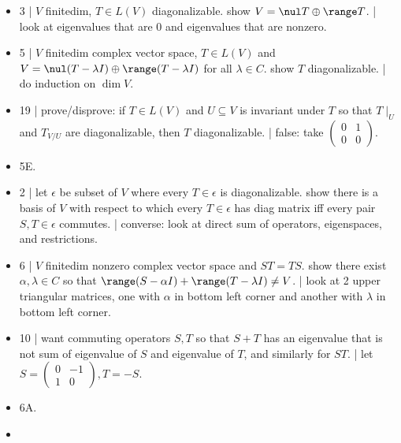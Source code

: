 \begin{itemize}
	\item 3 | $V$ finitedim, $T \in L(V)$ diagonalizable. show $V = \nul T \oplus \range T$. | look at eigenvalues that are 0 and eigenvalues that are nonzero. 
	\item 5 | $V$ finitedim complex vector space, $T \in L(V)$ and $V = \nul (T - \lambda I) \oplus \range (T - \lambda I)$ for all $\lambda \in C$. show $T$ diagonalizable. | do induction on $\dim V$. 
	\item 19 | prove/disprove: if $T \in L(V)$ and $U \subseteq V$ is invariant under $T$ so that $T \mid_U$ and $T_{V/U}$ are diagonalizable, then $T$ diagonalizable. | false: take $\begin{pmatrix} 0 & 1 \\ 0 & 0 \end{pmatrix}$. 
	\item 5E. 
	\item 2 | let $\epsilon$ be subset of $V$ where every $T \in \epsilon$ is diagonalizable. show there is a basis of $V$ with respect to which every $T \in \epsilon$ has diag matrix iff every pair $S,T \in \epsilon$ commutes. | converse: look at direct sum of operators, eigenspaces, and restrictions. 
	\item 6 | $V$ finitedim nonzero complex vector space and $ST=TS$. show there exist $\alpha,\lambda \in C$ so that $\range (S-\alpha I) + \range (T-\lambda I) \neq V$. | look at 2 upper triangular matrices, one with $\alpha$ in bottom left corner and another with $\lambda$ in bottom left corner. 
	\item 10 | want commuting operators $S,T$ so that $S+T$ has an eigenvalue that is not sum of eigenvalue of $S$ and eigenvalue of $T$, and similarly for $ST$. | let $S = \begin{pmatrix} 0 & -1 \\ 1 & 0 \end{pmatrix}, T = -S$. 
	\item 6A. 
	\item 
\end{itemize}


